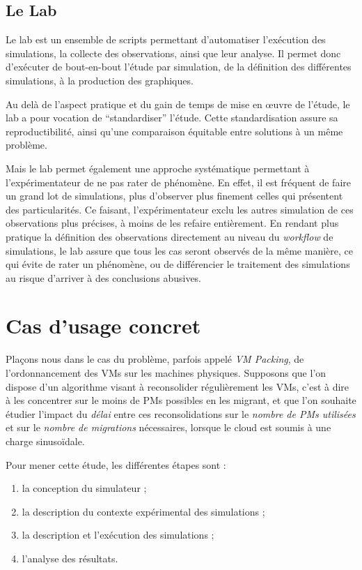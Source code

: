 \documentclass[parallelisme]{compas2017}
\begin{document}
\subsection{Le Lab}

Le lab est un ensemble de scripts permettant d'automatiser l'exécution des simulations, la collecte des
observations, ainsi que leur analyse. Il permet donc d'exécuter de bout-en-bout l'étude par simulation,
de la définition des différentes simulations, à la production des graphiques.

Au delà de l'aspect pratique et du gain de temps de mise en œuvre de l'étude, le lab a pour vocation
de ``standardiser'' l'étude. Cette standardisation assure sa reproductibilité, ainsi qu'une comparaison
équitable entre solutions à un même problème.

Mais le lab permet également une approche systématique permettant à 
l'expérimentateur de ne pas rater de phénomène. En effet, il est fréquent de 
faire un grand lot de simulations, plus d'observer plus finement celles qui 
présentent des particularités. Ce faisant, l'expérimentateur exclu les autres 
simulation de ces observations plus précises, à moins de les refaire 
entièrement. En rendant plus pratique la définition des observations 
directement au niveau du \textit{workflow} de simulations, le lab assure que 
tous les cas seront observés de la même manière, ce qui évite de rater un 
phénomène, ou de différencier le traitement des simulations au risque d'arriver 
à des conclusions abusives.


\section{Cas d'usage concret} \label{sec:usecase}

Plaçons nous dans le cas du problème, parfois appelé \textit{VM Packing}, de 
l'ordonnancement des VMs sur les machines physiques. 
Supposons que l'on dispose d'un algorithme visant à reconsolider 
régulièrement les VMs, c'est à dire à les concentrer sur le moins de PMs 
possibles en les migrant, et que l'on souhaite étudier l'impact du \emph{délai}
entre ces reconsolidations sur le \emph{nombre de PMs utilisées} et sur le 
\emph{nombre de migrations} nécessaires, lorsque le cloud est soumis à une 
charge sinusoïdale.

Pour mener cette étude, les différentes étapes sont :
\begin{enumerate}
 \itemsep0em
 \item la conception du simulateur ;
 \item la description du contexte expérimental des simulations ;
 \item la description et l'exécution des simulations ;
 \item l'analyse des résultats.
\end{enumerate}
\end{document}
